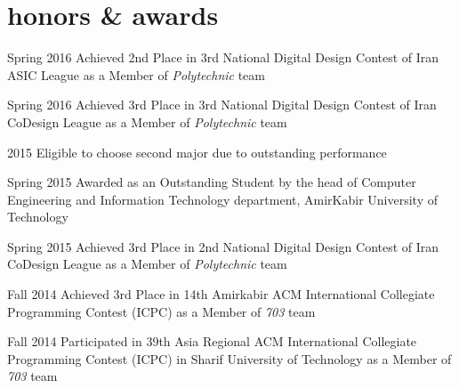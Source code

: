 \documentclass[]{friggeri-cv} %
\begin{document}
\section{honors \& awards}

\begin{entrylist}
	

	\entry
	{Spring 2016}
	{{\normalfont Achieved} \textcolor{TextYellow}{2nd} {\normalfont Place in 3rd National Digital Design Contest of Iran ASIC League as a Member of \emph{Polytechnic} team}}
	{}
	{}


	\entry
	{Spring 2016}
	{{\normalfont Achieved} \textcolor{TextYellow}{3rd} {\normalfont Place in 3rd National Digital Design Contest of Iran CoDesign League as a Member of \emph{Polytechnic} team}}
	{}
	{}


	\entry
	{2015}
	{{\normalfont Eligible to choose} \textcolor{TextGreen}{second major} {\normalfont due to outstanding performance}}
	{}
	{}


	\entry
	{Spring 2015}
	{\normalfont Awarded as an Outstanding Student by the head of Computer Engineering and Information Technology department, AmirKabir University of Technology}
	{}
	{}


	\entry
	{Spring 2015}
	{{\normalfont Achieved} \textcolor{TextYellow}{3rd} {\normalfont Place in 2nd National Digital Design Contest of Iran CoDesign League as a Member of \emph{Polytechnic} team}}
	{}
	{}


	\entry
	{Fall 2014}
	{{\normalfont Achieved} \textcolor{UniBlue}{3rd} {\normalfont Place in 14th Amirkabir ACM International Collegiate Programming Contest (ICPC) as a Member of \emph{703} team}}
	{}
	{}


	\entry
	{Fall 2014}
	{\normalfont Participated in 39th Asia Regional ACM International Collegiate Programming Contest (ICPC) in Sharif University of Technology as a Member of \emph{703} team}
	{}
	{}


\end{entrylist}
\end{document}
